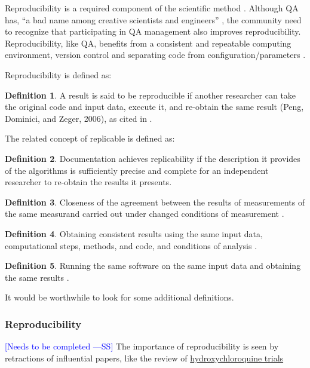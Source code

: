 \documentclass[letterpaper, cleveref]{lipics-v2019}
\newcommand{\authornote}[3]{\textcolor{#1}{[#3 ---#2]}}
\newcommand{\authornote}[3]{}
\newcommand{\wss}[1]{\authornote{blue}{SS}{#1}} %
\theoremstyle{definition}
\newtheorem{defn}{Definition}
\begin{document}
Reproducibility is a required component of the scientific method
\citep{Davison2012}.  Although QA has, ``a bad name among creative
scientists and engineers'' \citep[p.~352]{Roache1998}, the community need to
recognize that participating in QA management also improves reproducibility.
Reproducibility, like QA, benefits from a consistent and repeatable
computing environment, version control and separating code from
configuration/parameters \citep{Davison2012}.

Reproducibility is defined as:

\begin{defn}
  A result is said to be reproducible if another researcher can take the
  original code and input data, execute it, and re-obtain the same result
  (Peng, Dominici, and Zeger, 2006), as cited in
  \citet{BenureauAndRougier2017}.
\end{defn}

The related concept of replicable is defined as:

\begin{defn}
  Documentation achieves replicability if the description it provides of the
  algorithms is sufficiently precise and complete for an independent researcher
  to re-obtain the results it presents.  \citep{BenureauAndRougier2017}
\end{defn}

\begin{defn}
Closeness of the agreement between the results of measurements of the same measurand carried out under changed conditions of measurement \citep{iso2017iec}.
\end{defn}

\begin{defn}
Obtaining consistent results using the same input data, computational steps,  methods, and code, and conditions of analysis \citep{national2019reproducibility}.
\end{defn}

\begin{defn}
Running the same software on the same input data and obtaining the same results \citep{rougier2017sustainable}.
\end{defn}

It would be worthwhile to look for some additional definitions.

\begin{mybox}
\subsubsection*{Reproducibility} 
\wss{Needs to be completed}
The importance of reproducibility is seen by retractions of influential
papers, like the review of \href{https://www.theguardian
.com/commentisfree/2020/jun/05/lancet-had-to-do-one-of-the-biggest
-retractions-in-modern-history-how-could-this-happen} {hydroxychloroquine
trials}
\end{mybox}
\end{document}
